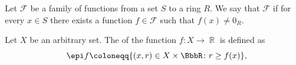 \begin{definition}\label{def:functions_vanish_nowhere}
  Let \( \mathcal{F} \) be a family of functions from a set \( S \) to a ring \( R \). We say that \( \mathcal{F} \)  if for every \( x \in S \) there exists a function \( f \in \mathcal{F} \) such that \( f(x) \neq 0_R \).
\end{definition}

\begin{definition}\label{def:epigraph}
  Let \( X \) be an arbitrary set. The  of the function \( f: X \to \BbbR \) is defined as
  \begin{equation*}
    \epi f \coloneqq \{ (x, r) \in X \times \BbbR \colon r \geq f(x) \},
  \end{equation*}
\end{definition}

\begin{definition}\label{def:vector_field}
\end{definition}

\begin{theorem}\label{thm:intermedaite_value_theorem}
\end{theorem}
